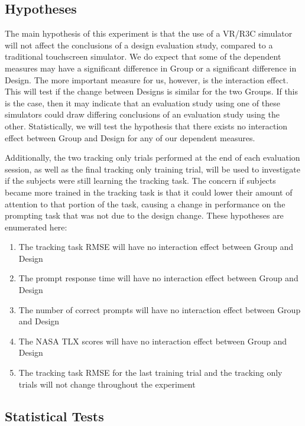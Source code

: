 \subsection{Hypotheses}

The main hypothesis of this experiment is that the use of a VR/R3C simulator will not affect the conclusions of a design evaluation study, compared to a traditional touchscreen simulator.
We do expect that some of the dependent measures may have a significant difference in Group or a significant difference in Design.
The more important measure for us, however, is the interaction effect.
This will test if the change between Designs is similar for the two Groups.
If this is the case, then it may indicate that an evaluation study using one of these simulators could draw differing conclusions of an evaluation study using the other.
Statistically, we will test the hypothesis that there exists no interaction effect between Group and Design for any of our dependent measures.

Additionally, the two tracking only trials performed at the end of each evaluation session, as well as the final tracking only training trial, will be used to investigate if the subjects were still learning the tracking task.
The concern if subjects became more trained in the tracking task is that it could lower their amount of attention to that portion of the task, causing a change in performance on the prompting task that was not due to the design change.
These hypotheses are enumerated here:

\begin{enumerate}[label={H\arabic*.}]
    \item The tracking task RMSE will have no interaction effect between Group and Design
    \item The prompt response time will have no interaction effect between Group and Design
    \item The number of correct prompts will have no interaction effect between Group and Design
    \item The NASA TLX scores will have no interaction effect between Group and Design
    \item The tracking task RMSE for the last training trial and the tracking only trials will not change throughout the experiment
\end{enumerate}

\subsection{Statistical Tests}

